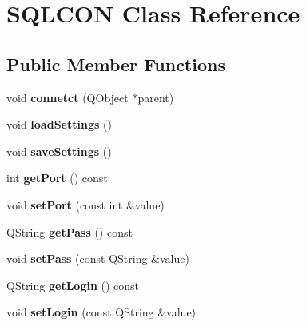 \hypertarget{class_s_q_l_c_o_n}{}\section{S\+Q\+L\+C\+ON Class Reference}
\label{class_s_q_l_c_o_n}
\subsection*{Public Member Functions}
\begin{DoxyCompactItemize}
\item 
\hypertarget{class_s_q_l_c_o_n_a4b5fe8f86c8f7e5ef789ae83d77783b3}{}\label{class_s_q_l_c_o_n_a4b5fe8f86c8f7e5ef789ae83d77783b3} 
void {\bfseries connetct} (Q\+Object $\ast$parent)
\item 
\hypertarget{class_s_q_l_c_o_n_a8bf29da8885cda8568217d238a3f9a70}{}\label{class_s_q_l_c_o_n_a8bf29da8885cda8568217d238a3f9a70} 
void {\bfseries load\+Settings} ()
\item 
\hypertarget{class_s_q_l_c_o_n_a2189744edaf1ee3e4cf29e78cf3d412a}{}\label{class_s_q_l_c_o_n_a2189744edaf1ee3e4cf29e78cf3d412a} 
void {\bfseries save\+Settings} ()
\item 
\hypertarget{class_s_q_l_c_o_n_ac4aca7afd1ec62ba3ebf9b5701bf7d2a}{}\label{class_s_q_l_c_o_n_ac4aca7afd1ec62ba3ebf9b5701bf7d2a} 
int {\bfseries get\+Port} () const
\item 
\hypertarget{class_s_q_l_c_o_n_a33d33265a3cd24202c0783b77b4f9360}{}\label{class_s_q_l_c_o_n_a33d33265a3cd24202c0783b77b4f9360} 
void {\bfseries set\+Port} (const int \&value)
\item 
\hypertarget{class_s_q_l_c_o_n_a54ecc284e59e35653280b8c091702255}{}\label{class_s_q_l_c_o_n_a54ecc284e59e35653280b8c091702255} 
Q\+String {\bfseries get\+Pass} () const
\item 
\hypertarget{class_s_q_l_c_o_n_a381507ec32fcb1006d0d141ba3510e15}{}\label{class_s_q_l_c_o_n_a381507ec32fcb1006d0d141ba3510e15} 
void {\bfseries set\+Pass} (const Q\+String \&value)
\item 
\hypertarget{class_s_q_l_c_o_n_ac03190b87c99cedee7ba762a78ab1308}{}\label{class_s_q_l_c_o_n_ac03190b87c99cedee7ba762a78ab1308} 
Q\+String {\bfseries get\+Login} () const
\item 
\hypertarget{class_s_q_l_c_o_n_a36a5c1a719e6b67be73ed075d96084a2}{}\label{class_s_q_l_c_o_n_a36a5c1a719e6b67be73ed075d96084a2} 
void {\bfseries set\+Login} (const Q\+String \&value)
\item 
\hypertarget{class_s_q_l_c_o_n_a9490fdf5df564cc032dec7424eb619d8}{}\label{class_s_q_l_c_o_n_a9490fdf5df564cc032dec7424eb619d8} 

\end{DoxyCompactItemize}
